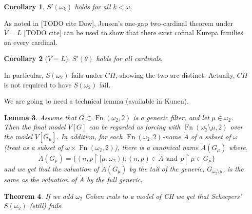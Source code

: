 \documentclass{amsart}
\theoremstyle{plain}
\newtheorem{theorem}{Theorem}
\newtheorem{lemma}[theorem]{Lemma}
\newtheorem{corollary}[theorem]{Corollary}
\theoremstyle{definition}
\theoremstyle{remark}
\theoremstyle{plain}
\theoremstyle{definition}
\theoremstyle{remark}
\begin{document}
  \begin{corollary}
    \(S'(\omega_k)\) holds for all \(k<\omega\).
  \end{corollary}

  As noted in [TODO cite Dow],
  Jensen's one-gap two-cardinal theorem under \(V=L\) [TODO cite] can be used
  to show that there exist cofinal Kurepa families on every cardinal.

  \begin{corollary}[\(V=L\)]
    \(S'(\theta)\) holds for all cardinals.
  \end{corollary}

  In particular, \(S(\omega_2)\) fails under \(CH\), showing the two are
  distinct. Actually, \(CH\) is not required to have \(S(\omega_2)\) fail.


        We are going to need a technical lemma (available in Kunen).
        \bigskip

        \begin{lemma}
        Assume that $G\subset \operatorname{Fn}(\omega_2,2)$ is a generic filter,
         and let $\mu\in \omega_2$. Then the final model $V[G]$ can be
         regarded as forcing  with $\operatorname{Fn}(\omega_2\setminus \mu,
         2)$ over the model $V[G_\mu]$.
        In addition, for each $\operatorname{Fn}(\omega_2,2)$-name $\dot A$
        of a subset of $\omega$ (treat as a subset of $\omega\times
        \operatorname{Fn}(\omega_2,2) $),
        there is a canonical name $\dot A(G_\mu)$ where,
        $$\dot A(G_\mu) = \{ (n,p\restriction [\mu,\omega_2))  :
         (n,p)\in \dot A\ \ \mbox{and} \ \ p\restriction \mu\in G_\mu\}$$
        and we get that the valuation of $\dot A(G_\mu)$ by the tail
        of the generic, $G_{\omega_2\setminus \mu}$, is the same as
        the valuation of $\dot A$ by the full generic.
        \end{lemma}


        \begin{theorem}
          If we add $\omega_2$ Cohen reals to a model of CH we get
        that Scheepers' $S(\omega_2)$ (still) fails.
        \end{theorem}
\end{document}

